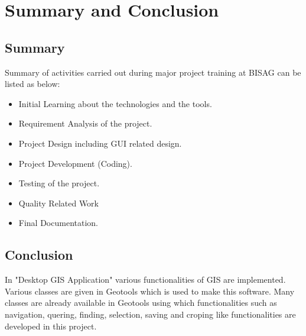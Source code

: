 \chapter{Summary and Conclusion}

\section{Summary}
Summary of activities carried out during major project training at BISAG can be listed as below:
\begin{itemize}
\item Initial Learning about the technologies and  the tools.
\item Requirement Analysis of the project.
\item Project Design including GUI related  design.
\item Project Development (Coding).
\item Testing  of the project.
\item Quality Related Work
\item Final  Documentation.
\end{itemize}

\section{Conclusion}
In "Desktop GIS Application" various functionalities of GIS are implemented. Various classes are given in Geotools which is used to make this software. Many classes are already available in Geotools using which functionalities such as navigation, quering, finding, selection, saving and croping like functionalities
are developed in this project.
